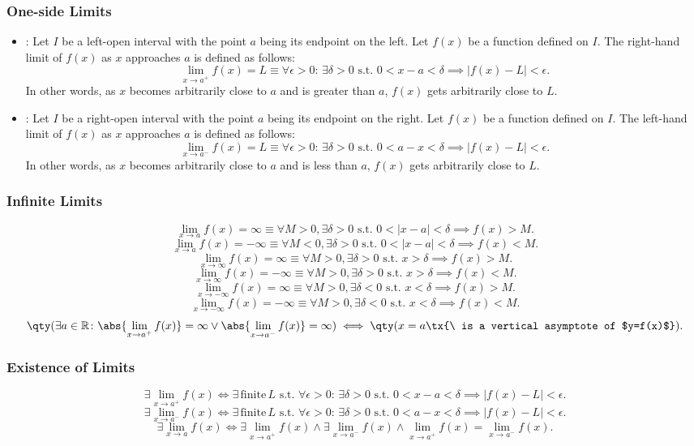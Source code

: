 \documentclass[a4paper,12pt]{report}
\begin{document}
\subsubsection{One-side Limits}
\begin{itemize}
\item {}: Let \(I\) be a left-open interval with the point \(a\) being its endpoint on the left. Let \( f(x) \) be a function defined on \(I\). The right-hand limit of \( f(x) \) as \( x \) approaches \( a \) is defined as follows:
\[\lim_{x \to a^+} f(x) = L \equiv \forall \epsilon > 0 :\,\exists \delta > 0 \text{\ s.t.\ } 0 < x - a < \delta \implies |f(x) - L| < \epsilon.\]
In other words, as \(x\) becomes arbitrarily close to \(a\) and is greater than \(a\), \(f(x)\) gets arbitrarily close to \(L\).
\item {}: Let \(I\) be a right-open interval with the point \(a\) being its endpoint on the right. Let \( f(x) \) be a function defined on \(I\). The left-hand limit of \( f(x) \) as \( x \) approaches \( a \) is defined as follows:
\[\lim_{x \to a^-} f(x) = L \equiv \forall \epsilon > 0 :\,\exists \delta > 0 \text{\ s.t.\ } 0 < a - x < \delta \implies |f(x) - L| < \epsilon.\]
In other words, as \(x\) becomes arbitrarily close to \(a\) and is less than \(a\), \(f(x)\) gets arbitrarily close to \(L\).
\end{itemize}
\subsubsection{Infinite Limits}
\[\lim_{x\to a}f(x)=\infty \equiv \forall M > 0, \exists \delta > 0 \text{\ s.t.\ } 0 < |x - a| < \delta \implies f(x) > M.\]
\[\lim_{x\to a}f(x)=-\infty \equiv \forall M < 0, \exists \delta > 0 \text{\ s.t.\ } 0 < |x - a| < \delta \implies f(x) < M.\]
\[\lim_{x\to\infty}f(x)=\infty \equiv \forall M > 0, \exists \delta > 0 \text{\ s.t.\ } x > \delta \implies f(x) > M.\]
\[\lim_{x\to\infty}f(x)=-\infty \equiv \forall M > 0, \exists \delta > 0 \text{\ s.t.\ } x > \delta \implies f(x) < M.\]
\[\lim_{x\to-\infty}f(x)=\infty \equiv \forall M > 0, \exists \delta < 0 \text{\ s.t.\ } x < \delta \implies f(x) > M.\]
\[\lim_{x\to-\infty}f(x)=-\infty \equiv \forall M > 0, \exists \delta < 0 \text{\ s.t.\ } x < \delta \implies f(x) < M.\]
\[\qty(\exists a\in\mathbb{R}\colon\abs{\lim_{x \to a^+} f(x)}=\infty\lor\abs{\lim_{x \to a^-} f(x)}=\infty)\iff \qty(x=a\tx{\ is a vertical asymptote of $y=f(x)$}).\]
\subsubsection{Existence of Limits}
\[\exists\lim_{x \to a^+} f(x) \iff \exists \,\text{finite}\,L\text{\ s.t.\ }\forall \epsilon > 0:\, \exists \delta > 0 \text{\ s.t.\ } 0 < x - a < \delta \implies |f(x) - L| < \epsilon.\]
\[\exists\lim_{x \to a^-} f(x) \iff \exists \,\text{finite}\,L\text{\ s.t.\ }\forall \epsilon > 0 :\,\exists \delta > 0 \text{\ s.t.\ } 0 < a - x < \delta \implies |f(x) - L| < \epsilon.\]
\[\exists\lim_{x \to a} f(x) \iff \exists \lim_{x \to a^+} f(x)\land\exists \lim_{x \to a^-} f(x)\land\lim_{x \to a^+} f(x) = \lim_{x \to a^-} f(x).\]
\end{document}
